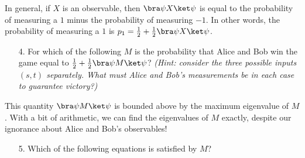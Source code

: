 \begin{exercises}
In general, if $X$ is an observable, then $\bra\psi X \ket \psi$ is equal to the probability of measuring a $1$ minus the probability of measuring $-1$. In other words, the probability of measuring a $1$ is $p_1 = \frac12 + \frac12\bra\psi X \ket \psi$.
\begin{enumerate}
\item[4.] For which of the following $M$ is the probability that Alice and Bob win the game equal to $\frac 12 + \frac12 \bra\psi M \ket \psi$?
\emph{(Hint: consider the three possible inputs $(s,t)$ separately. What must Alice and Bob's measurements be in each case to guarantee victory?)}
\end{enumerate}
This quantity $\bra \psi M \ket \psi$ is bounded above by the maximum eigenvalue of $M$. With a bit of arithmetic, we can find the eigenvalues of $M$ exactly, despite our ignorance about Alice and Bob's observables!
\begin{enumerate}
\item[5.] Which of the following equations is satisfied by $M$?

\end{enumerate}
\end{exercises}
